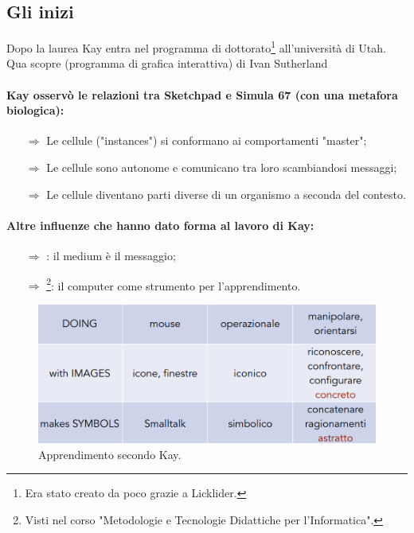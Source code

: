 \subsection{Gli inizi}

Dopo la laurea Kay entra nel programma di dottorato\footnote{Era stato creato da poco grazie a Licklider.} all'università di Utah.
Qua scopre  (programma di grafica interattiva) di Ivan Sutherland 


\paragraph{Kay osservò le relazioni tra Sketchpad e Simula 67 (con una metafora biologica):}

\begin{itemize}
    \item [$\Rightarrow$] Le cellule ("instances") si conformano ai comportamenti "master";
    \item [$\Rightarrow$] Le cellule sono autonome e comunicano tra loro scambiandosi messaggi;
    \item [$\Rightarrow$] Le cellule diventano parti diverse di un organismo a seconda del contesto.
\end{itemize}


\paragraph{Altre influenze che hanno dato forma al lavoro di Kay:}

\begin{itemize}
    \item [$\Rightarrow$] : il medium è il messaggio;
    \item [$\Rightarrow$] \footnote{Visti nel corso "Metodologie
    e Tecnologie Didattiche per l'Informatica".}: il computer come strumento per l'apprendimento.
\end{itemize}

\begin{figure}[h]
    \centering
    \includegraphics[scale=0.45]{images/App.png}
    \caption{Apprendimento secondo Kay.}
\end{figure}


